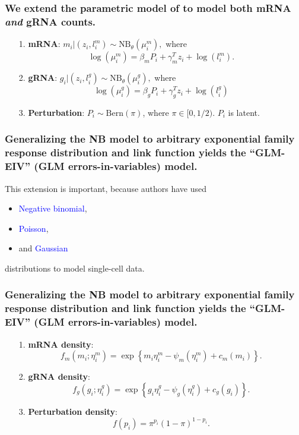 \documentclass{beamer}
\begin{document}
\begin{frame}
\frametitle{We extend the parametric model of \cite{Sarkar2021} to model both mRNA \textit{and} gRNA counts.}
\begin{itemize}
\item[1.] \textbf{mRNA}: $m_i | (z_i, l_i^m) \sim \textrm{NB}_\theta(\mu^m_i),$ where $$ \log\left( \mu^m_i \right) = \beta_m P_i + \gamma_m^T z_i + \log(l^m_i).$$
\item[2.] \textbf{gRNA}: $g_i | (z_i, l_i^g) \sim \textrm{NB}_\theta (\mu_i^g),$ where $$\log(\mu_i^g) = \beta_g P_i + \gamma_g^T z_i + \log(l_i^g)$$
\item[3.] \textbf{Perturbation}: $P_i \sim \textrm{Bern}(\pi)$, where $\pi \in [0, 1/2)$. $P_i$ is latent.
\end{itemize}
\end{frame}

\begin{frame}
\frametitle{Generalizing the NB model to arbitrary exponential family response distribution and link function yields the ``GLM-EIV'' (GLM errors-in-variables) model.}

This extension is important, because authors have used
 \begin{itemize}
 \item \textcolor{blue}{Negative binomial}, \cite{Choudhary2021}
 \item \textcolor{blue}{Poisson}, \cite{Schraivogel2020}
 \item and \textcolor{blue}{Gaussian} \cite{Lin2021}
 \end{itemize}
distributions to model single-cell data.
\end{frame}


\begin{frame}
\frametitle{Generalizing the NB model to arbitrary exponential family response distribution and link function yields the ``GLM-EIV'' (GLM errors-in-variables) model.}

\begin{itemize}
\item[1.] \textbf{mRNA density}: $$f_m(m_i; \eta^m_i) = \exp\left\{m_i \eta_i^m - \psi_m(\eta_i^m) + c_m(m_i) \right\}.$$
\item[2.] \textbf{gRNA density}: $$f_g(g_i; \eta^g_i) = \exp\left\{ g_i \eta_i^g - \psi_g(\eta_i^g) + c_g(g_i) \right\}.$$
\item[3.] \textbf{Perturbation density}: $$ f(p_i) = \pi^{p_i} (1-\pi)^{1-p_i}.$$
\end{itemize}
\end{frame}
\end{document}
